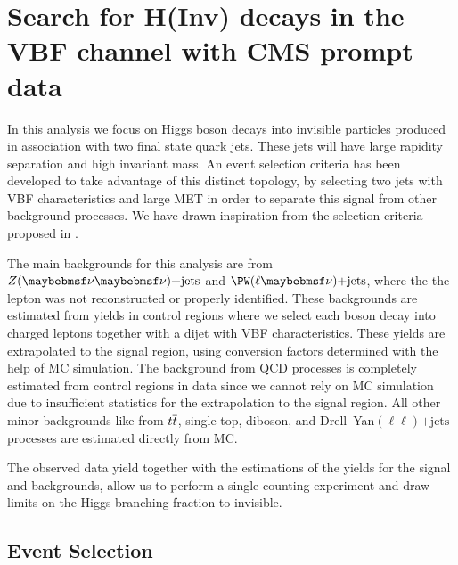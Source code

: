 \chapter{Search for H(Inv) decays in the VBF channel with CMS prompt data}
\label{CHAPTER:PromptDataAnalysis}

\glsresetall %


In this analysis we focus on Higgs boson decays into invisible particles produced in association with two final state quark jets. These jets will have large rapidity separation and high invariant mass. An event selection criteria has been developed to take advantage of this distinct topology, by selecting two jets with \gls{VBF} characteristics and large \gls{MET} in order to separate this signal from other background processes. We have drawn inspiration from the selection criteria proposed in \cite{ARTICLE:Zeppenfeld_ObservingAnInvisibleHiggsboson}.

The main backgrounds for this analysis are from $\Z (\nu \nu)\text{+jets}$ and $\PW (\ell \nu)\text{+jets}$, where the the lepton was not reconstructed or properly identified. These backgrounds are estimated from yields in control regions where we select each boson decay into charged leptons together with a dijet with \gls{VBF} characteristics. These yields are extrapolated to the signal region, using conversion factors determined with the help of \gls{MC} simulation. The background from \gls{QCD} processes is completely estimated from control regions in data since we cannot rely on \gls{MC} simulation due to insufficient statistics for the extrapolation to the signal region. All other minor backgrounds like from $t\overline{t}$, single-top, diboson, and Drell--Yan$(\ell\ell)\text{+jets}$ processes are estimated directly from \gls{MC}. 

The observed data yield together with the estimations of the yields for the signal and backgrounds, allow us to perform a single counting experiment and draw limits on the Higgs branching fraction to invisible.

\section{Event Selection}
\label{SECTION:PromptDataAnalysis_EventSelection}

